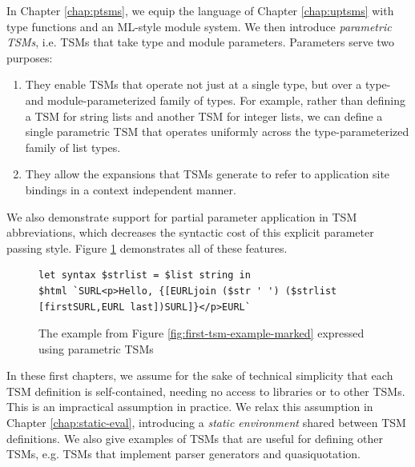 In Chapter \ref{chap:ptsms}, we equip the language of Chapter \ref{chap:uptsms} with type functions and an ML-style module system. We then introduce \emph{parametric TSMs}, i.e. TSMs that take type and module parameters. Parameters serve two purposes:
\begin{enumerate}
\item They enable TSMs that operate not just at a single type, but over a type- and module-parameterized family of types. For example, rather than defining a TSM  for string lists and another TSM  for integer lists, we can define a single parametric TSM  that operates uniformly across the type-parameterized family of list types. 
\item They allow the expansions that TSMs generate to refer to application site bindings in a context independent manner. 
\end{enumerate}
We also demonstrate support for partial parameter application in TSM abbreviations, which decreases the syntactic cost of this explicit parameter passing style. Figure \ref{fig:first-ptsm-example-marked} demonstrates all of these features.

\begin{figure}[h]
\begin{lstlisting}[numbers=none,xleftmargin=0px]
let syntax $strlist = $list string in 
$html `SURL<p>Hello, {[EURLjoin ($str ' ') ($strlist [firstSURL,EURL last])SURL]}</p>EURL`
\end{lstlisting}
\caption{The example from Figure \ref{fig:first-tsm-example-marked} expressed using parametric TSMs}
\label{fig:first-ptsm-example-marked}
\end{figure}

In these first chapters, we assume for the sake of technical simplicity that each TSM definition is self-contained, needing no access to libraries or to other TSMs. This is an impractical assumption in practice. We relax this assumption in Chapter \ref{chap:static-eval}, introducing a \emph{static environment} shared between TSM definitions. We also give examples of TSMs that are useful for defining other TSMs, e.g. TSMs that implement parser generators and quasiquotation.

